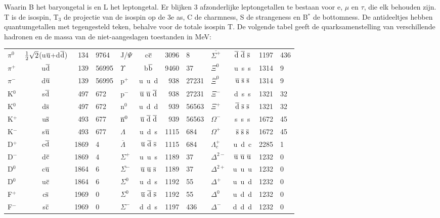 Waarin B het baryongetal is en L het leptongetal. Er blijken 3 afzonderlijke
leptongetallen te bestaan voor e, $\mu$ en $\tau$, die elk behouden zijn. T
is de isospin, T$_3$ de projectie van de isospin op de 3e as, C de charmness,
S de strangeness en B$^*$ de bottomness. De antideeltjes hebben
quantumgetallen met tegengesteld teken, behalve voor de totale isospin T. De
volgende tabel geeft de quarksamenstelling van verschillende hadronen en de
massa van de niet-aangeslagen toestanden in MeV:
\begin{center}
\begin{tabular}{||l|cr@{,}l||l|cr@{,}l||l|cr@{,}l||}
\hline
$\pi^0$&$\mbox{$\frac{1}{2}$}\sqrt{2}$(u$\overline{\rm u}$+d$\overline{\rm d}$)&134&9764&J/$\Psi$&c$\overline{\rm c}$&3096&8&$\overline{\Sigma^+}$&$\overline{\rm d}~\overline{\rm d}~\overline{\rm s}$&1197&436\rule{0pt}{15pt}\\
$\pi^+$&u$\overline{\rm d}$&139&56995&$\Upsilon$&b$\overline{\rm b}$&9460&37 &$\Xi^0$&u~s~s&1314&9\\
\cline{5-8}
$\pi^-$&d$\overline{\rm u}$&139&56995&p$^+$&u~u~d&938&27231&$\overline{\Xi}^0$&$\overline{\rm u}~\overline{\rm s}~\overline{\rm s}$&1314&9\\
K$^0$&s$\overline{\rm d}$&497&672&p$^-$&$\overline{\rm u}~\overline{\rm u}~\overline{\rm d}$&938&27231&$\Xi^-$&d~s~s&1321&32\\
K$^0$&d$\overline{\rm s}$&497&672&n$^0$&u~d~d&939&56563&$\Xi^+$&$\overline{\rm d}~\overline{\rm s}~\overline{\rm s}$&1321&32\\
K$^+$&u$\overline{\rm s}$&493&677&$\overline{\rm n}^0$&$\overline{\rm u}~\overline{\rm d}~\overline{\rm d}$&939&56563&$\Omega^-$&s~s~s&1672&45\\
K$^-$&s$\overline{\rm u}$&493&677&$\Lambda$&u~d~s&1115&684&$\Omega^+$&$\overline{\rm s}~\overline{\rm s}~\overline{\rm s}$&1672&45\\
D$^+$&c$\overline{\rm d}$&1869&4&$\overline{\Lambda}$&$\overline{\rm u}~\overline{\rm d}~\overline{\rm s}$&1115&684&$\Lambda_c^+$&u~d~c&2285&1\\
D$^-$&d$\overline{\rm c}$&1869&4&$\Sigma^+$&u~u~s&1189&37&$\Delta^{2-}$&$\overline{\rm u}~\overline{\rm u}~\overline{\rm u}$&1232&0\\
D$^0$&c$\overline{\rm u}$&1864&6&$\overline{\Sigma^-}$&$\overline{\rm u}~\overline{\rm u}~\overline{\rm s}$&1189&37&$\Delta^{2+}$&u~u~u&1232&0\\
D$^0$&u$\overline{\rm c}$&1864&6&$\Sigma^0$&u~d~s&1192&55&$\Delta^+$&u~u~d&1232&0\\
F$^+$&c$\overline{\rm s}$&1969&0&$\Sigma^0$&$\overline{\rm u}~\overline{\rm d}~\overline{\rm s}$&1192&55&$\Delta^0$&u~d~d&1232&0\\
F$^-$&s$\overline{\rm c}$&1969&0&$\Sigma^-$&d~d~s&1197&436&$\Delta^-$&d~d~d&1232&0\\
\hline
\end{tabular}
\end{center}
